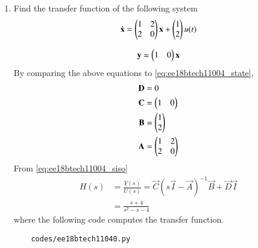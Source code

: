 \begin{enumerate}[label=\thesubsection.\arabic*.,ref=\thesubsection.\theenumi]

\item Find the transfer function of the following system 
%
\begin{align}
    \mathbf{\dot x } = \begin{pmatrix} 1&2\\ 2&0\end{pmatrix} \mathbf{x} + \begin{pmatrix} 1 \\2\end{pmatrix}u(t)   
\end{align}

\begin{align}
    \mathbf{y} = \begin{pmatrix} 1&0\end{pmatrix}\mathbf{x}
\end{align}
%
\solution By comparing the above equations to \eqref{eq:ee18btech11004_state},
%
\begin{align}
    \mathbf{D} &= 0
\\
    \mathbf{C} &= \begin{pmatrix}1&0\end{pmatrix}
\\
    \mathbf{B} &= \begin{pmatrix}1\\2\end{pmatrix}
\\
    \mathbf{A} &= \begin{pmatrix}1&2\\2&0\end{pmatrix}
\end{align}
%
From \eqref{eq:ee18btech11004_siso}
%
\begin{align}
    H(s) &= \frac{Y(s)}{U(s)} = \vec{C}(s\vec{I} - \vec{A})^{-1} \vec{B} + \vec{D}\vec{I}
\\
   & = \frac{s +4}{s^2 - s - 4}
\end{align}
%
where the following code computes the transfer function. 
\begin{lstlisting}
    codes/ee18btech11040.py
\end{lstlisting}


\end{enumerate}
